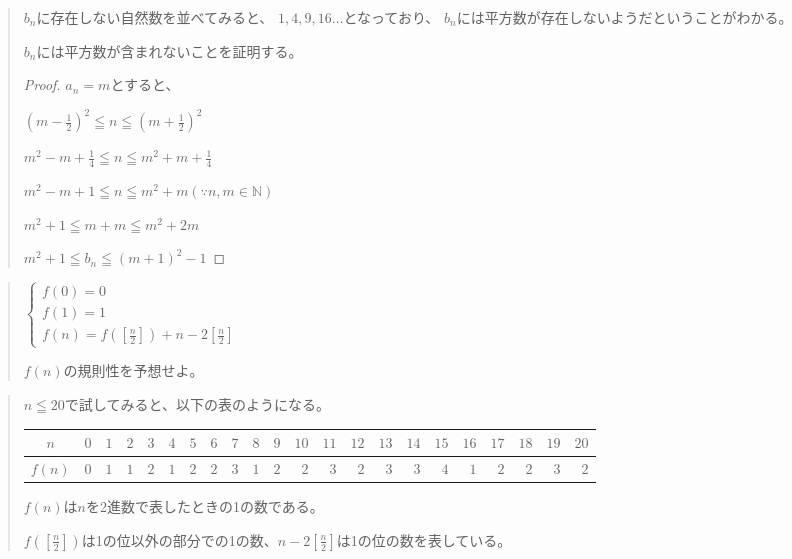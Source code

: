 \documentclass[uplatex,fleqn]{jsbook}
\begin{document}
\begin{quote}
    $b_n$に存在しない自然数を並べてみると、
    $1,4,9,16\dots$となっており、
    $b_n$には平方数が存在しないようだということがわかる。

    $b_n$には平方数が含まれないことを証明する。

    \begin{proof}
        $a_n=m$とすると、

        $\displaystyle \left(m-\frac{1}{2}\right) ^2\leqq n\leqq \left(m+\frac{1}{2}\right) ^2$

        $\displaystyle m^2-m+\frac{1}{4}\leqq n \leqq m^2+m+\frac{1}{4}$

        $\displaystyle m^2-m+1\leqq n \leqq m^2+m \left(\because n,m \in \mathbb{N}\right)$

        $m^2+1\leqq m+m \leqq m^2+2m$

        $m^2+1\leqq b_n \leqq \left(m+1\right)^2-1$

    \end{proof}

\end{quote}

\begin{quote}
    \begin{math}
        \begin{cases}
            f\left(0\right)=0\\
            f\left(1\right)=1\\
            \displaystyle f\left(n\right)=f\left(\left[\frac{n}{2}\right]\right)+n-2\left[\frac{n}{2}\right]
        \end{cases}
    \end{math}

    $f\left(n\right)$の規則性を予想せよ。
\end{quote}

\begin{quote}
    $n\leqq 20$で試してみると、以下の表のようになる。

    \begin{table}[h]
        \begin{tabular}{|c||r|r|r|r|r|r|r|r|r|r|r|r|r|r|r|r|r|r|r|r|r|}
            \hline
            $n$ & $0$ & $1$ & $2$ & $3$ & $4$ & $5$ & $6$ & $7$ & $8$ & $9$ & $10$ & $11$ & $12$ & $13$ & $14$ & $15$ & $16$ & $17$ & $18$ & $19$ & $20$\\\hline
            $f\left(n\right)$ & $0$ & $1$ & $1$ & $2$ & $1$ & $2$ & $2$ & $3$ & $1$ & $2$ & $2$ & $3$ & $2$ & $3$ & $3$ & $4$ & $1$ & $2$ & $2$ & $3$ & $2$\\\hline
        \end{tabular}
    \end{table}

    $f\left(n\right)$は$n$を2進数で表したときの1の数である。

    $\displaystyle f\left(\left[\frac{n}{2}\right]\right)$は1の位以外の部分での1の数、$\displaystyle n-2\left[\frac{n}{2}\right]$は1の位の数を表している。
\end{quote}
\end{document}

